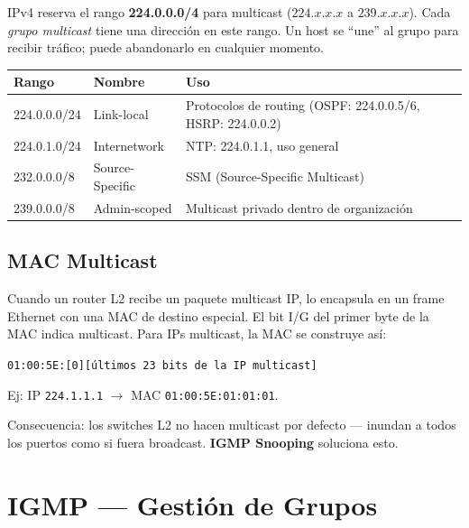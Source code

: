 \begin{concepto}
IPv4 reserva el rango \textbf{224.0.0.0/4} para multicast ($224.x.x.x$ a $239.x.x.x$).
Cada \emph{grupo multicast} tiene una dirección en este rango. Un host se ``une'' al
grupo para recibir tráfico; puede abandonarlo en cualquier momento.
\end{concepto}

\begin{center}
\begin{tabular}{lll}
\toprule
\textbf{Rango} & \textbf{Nombre} & \textbf{Uso} \\
\midrule
224.0.0.0/24   & Link-local       & Protocolos de routing (OSPF: 224.0.0.5/6, HSRP: 224.0.0.2) \\
224.0.1.0/24   & Internetwork     & NTP: 224.0.1.1, uso general \\
232.0.0.0/8    & Source-Specific  & SSM (Source-Specific Multicast) \\
239.0.0.0/8    & Admin-scoped     & Multicast privado dentro de organización \\
\bottomrule
\end{tabular}
\end{center}

\subsection{MAC Multicast}

\begin{concepto}
Cuando un router L2 recibe un paquete multicast IP, lo encapsula en un frame Ethernet
con una MAC de destino especial. El bit I/G del primer byte de la MAC indica multicast.
Para IPs multicast, la MAC se construye así:

\begin{center}
\texttt{01:00:5E:[0][últimos 23 bits de la IP multicast]}
\end{center}

Ej: IP \texttt{224.1.1.1} $\to$ MAC \texttt{01:00:5E:01:01:01}.

Consecuencia: los switches L2 no hacen multicast por defecto --- inundan a todos los
puertos como si fuera broadcast. \textbf{IGMP Snooping} soluciona esto.
\end{concepto}

\section{ IGMP --- Gestión de Grupos}

